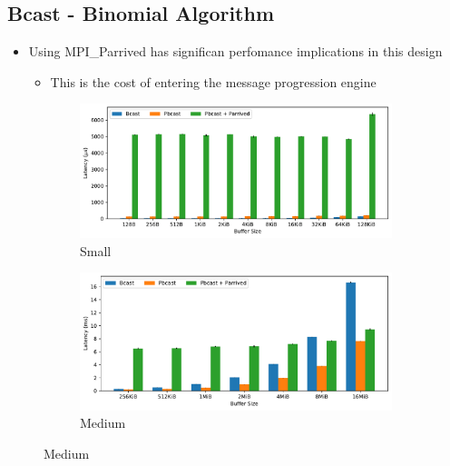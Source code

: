 \documentclass{article}
\begin{document}
  \clearpage
  \subsection{Bcast - Binomial Algorithm}
  \begin{itemize}
    \item Using MPI\_Parrived has significan perfomance implications in this design
    \begin{itemize}
      \item This is the cost of entering the message progression engine
    \end{itemize}
  \end{itemize}

  \begin{figure}[h]
    \centering
    \begin{subfigure}[b]{0.44\textwidth}
      \centering
      \includegraphics[width=\textwidth]{data-knomial-2-bcast/small_64.pdf}
      \caption{Small}
    \end{subfigure}

    \begin{subfigure}[b]{0.44\textwidth}
      \centering
      \includegraphics[width=\textwidth]{data-knomial-2-bcast/med_64.pdf}
      \caption{Medium}
    \end{subfigure}
    \hfill


\end{figure}
\end{document}
